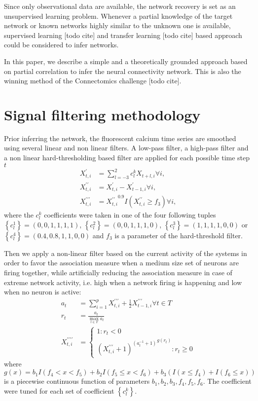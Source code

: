 \documentclass[wcp]{jmlr}
\begin{document}
Since only observational data are available, the network recovery is set as an
unsupervised learning problem. Whenever a partial knowledge of the target
network or known networks highly similar to the unknown one is available,
supervised learning [todo cite] and transfer learning  [todo cite] based
approach could be considered to infer networks.


In this paper, we describe a simple and a theoretically grounded approach
based on partial correlation to infer the neural connectivity network.
This is also the winning method of the Connectomics challenge [todo cite].

\section{Signal filtering methodology}
\label{sec:filter}

Prior inferring the network, the fluorescent calcium time series are smoothed
using several linear and non linear filters. A low-pass filter, a high-pass
filter and a non linear hard-thresholding based filter are
applied for each possible time step $t$
\begin{align}
X^\prime_{t,i} &= \sum_{l=-3}^2 c_l^k X_{t+l,i} \forall i, \\
X^{\prime\prime}_{t,i} &= X^{\prime}_{t,i} - X^{\prime}_{t-1,i} \forall i, \\
X^{\prime\prime\prime}_{t,i} &= {X^{\prime\prime}_{t,i}}^{0.9} I(X^{\prime\prime}_{t,i} \geq f_3) \forall i,
\end{align}
where the $c_l^k$ coefficients were taken in one of the four following tuples
$\left\{c_l^1\right\}=(0, 0, 1, 1, 1, 1)$,
$\left\{c_l^2\right\}=(0, 0, 1, 1, 1, 0)$,
$\left\{c_l^3\right\}=(1, 1, 1, 1, 0, 0)$ or
$\left\{c_l^4\right\}=(0.4, 0.8, 1, 1, 0, 0)$ and $f_3$ is a parameter
of the hard-threshold filter.

Then we apply a non-linear filter based on the current
activity of the systems in order to favor the association measure when
a medium size set of neurons are firing together, while artificially
reducing the association measure in case of extreme network activity,
i.e. high when a network firing is happening and low when no neuron is
active:
\begin{align}
a_t &= \sum_{i=1}^p X^{\prime\prime\prime}_{t,i} +
                   \frac{1}{2} X^{\prime\prime\prime}_{t-1,i} \forall t \in T\\
r_t &= \frac{a_t}{\max_{l \in T}{a_l}} \\
X^{\prime\prime\prime\prime}_{t,i} &=
\left\{
  \begin{array}{l}
    1  : r_t < 0\\
    {(X^{\prime\prime\prime}_{t,i} + 1)^{(a_t^{-1} + 1)}}^{g(r_t)} : r_t \geq 0
  \end{array}
\right.
\end{align}
where $g(x) = b_1 I(f_4 < x < f_5) + b_2  I(f_5 \leq x < f_6) +
b_3 (I(x\leq f_4) + I(f_ 6 \leq x))$ is a piecewise continuous function of
parameters $b_1, b_2, b_3, f_4, f_5, f_6$. The coefficient were tuned
for each set of coefficient $\left\{c_l^k\right\}$.
\end{document}
